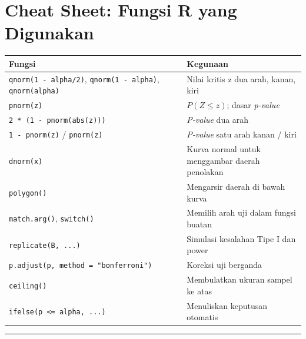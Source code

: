 \documentclass[
  indonesian,
  letterpaper,
]{book}
\newcounter{none} %
\begin{document}

\chapter{Cheat Sheet: Fungsi R yang
Digunakan}\label{cheat-sheet-fungsi-r-yang-digunakan-1}

{\def\LTcaptype{none} %
\begin{longtable}[]{@{}
  >{\raggedright\arraybackslash}p{}
  >{\raggedright\arraybackslash}p{}@{}}
\toprule\noalign{}
\begin{minipage}[b]{\linewidth}\raggedright
Fungsi
\end{minipage} & \begin{minipage}[b]{\linewidth}\raggedright
Kegunaan
\end{minipage} \\
\midrule\noalign{}
\endhead
\bottomrule\noalign{}
\endlastfoot
\texttt{qnorm(1\ -\ alpha/2)}, \texttt{qnorm(1\ -\ alpha)},
\texttt{qnorm(alpha)} & Nilai kritis z dua arah, kanan, kiri \\
\texttt{pnorm(z)} & \(P(Z \leq z)\); dasar \emph{p-value} \\
\texttt{2\ *\ (1\ -\ pnorm(abs(z)))} & \emph{P-value} dua arah \\
\texttt{1\ -\ pnorm(z)} / \texttt{pnorm(z)} & \emph{P-value} satu arah
kanan / kiri \\
\texttt{dnorm(x)} & Kurva normal untuk menggambar daerah penolakan \\
\texttt{polygon()} & Mengarsir daerah di bawah kurva \\
\texttt{match.arg()}, \texttt{switch()} & Memilih arah uji dalam fungsi
buatan \\
\texttt{replicate(B,\ ...)} & Simulasi kesalahan Tipe I dan power \\
\texttt{p.adjust(p,\ method\ =\ "bonferroni")} & Koreksi uji berganda \\
\texttt{ceiling()} & Membulatkan ukuran sampel ke atas \\
\texttt{ifelse(p\ \textless{}=\ alpha,\ ...)} & Menuliskan keputusan
otomatis \\
\end{longtable}
}

\begin{center}\rule{0.5\linewidth}{0.5pt}\end{center}

\end{document}
